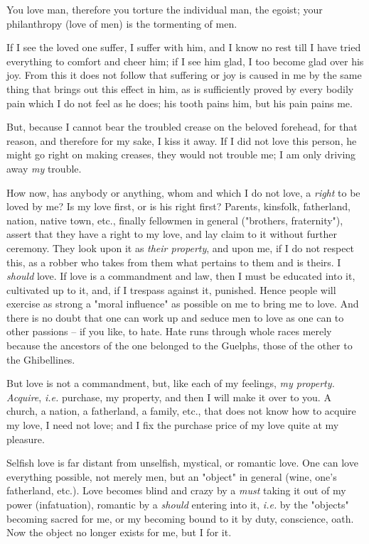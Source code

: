 \documentclass[a4paper]{book}
\begin{document}
You love man, therefore you torture the individual man, the egoist; your 
philanthropy (love of men) is the tormenting of men.

If I see the loved one suffer, I suffer with him, and I know no rest till I 
have tried everything to comfort and cheer him; if I see him glad, I too 
become glad over his joy. From this it does not follow that suffering or joy 
is caused in me by the same thing that brings out this effect in him, as is 
sufficiently proved by every bodily pain which I do not feel as he does; his 
tooth pains him, but his pain pains me.

But, because I cannot bear the troubled crease on the beloved forehead, for 
that reason, and therefore for my sake, I kiss it away. If I did not love this 
person, he might go right on making creases, they would not trouble me; I am 
only driving away \textit{my} trouble.

How now, has anybody or anything, whom and which I do not love, a 
\textit{right} to be loved by me? Is my love first, or is his right first? 
Parents, kinsfolk, fatherland, nation, native town, etc., finally fellowmen in 
general ("{}brothers, fraternity"{}), assert that they have a right to my 
love, and lay claim to it without further ceremony. They look upon it as 
\textit{their property}, and upon me, if I do not respect this, as a robber 
who takes from them what pertains to them and is theirs. I \textit{should} 
love. If love is a commandment and law, then I must be educated into it, 
cultivated up to it, and, if I trespass against it, punished. Hence people 
will exercise as strong a "{}moral influence"{} as possible on me to bring me 
to love. And there is no doubt that one can work up and seduce men to love as 
one can to other passions -- if you like, to hate. Hate runs through whole 
races merely because the ancestors of the one belonged to the Guelphs, those 
of the other to the Ghibellines.

But love is not a commandment, but, like each of my feelings, \textit{my 
property. Acquire}, \textit{i.e.} purchase, my property, and then I will make 
it over to you. A church, a nation, a fatherland, a family, etc., that does 
not know how to acquire my love, I need not love; and I fix the purchase price 
of my love quite at my pleasure.

Selfish love is far distant from unselfish, mystical, or romantic love. One 
can love everything possible, not merely men, but an "{}object"{} in general 
(wine, one's fatherland, etc.). Love becomes blind and crazy by a 
\textit{must} taking it out of my power (infatuation), romantic by a 
\textit{should} entering into it, \textit{i.e.} by the "{}objects"{} becoming 
sacred for me, or my becoming bound to it by duty, conscience, oath. Now the 
object no longer exists for me, but I for it.
\end{document}
